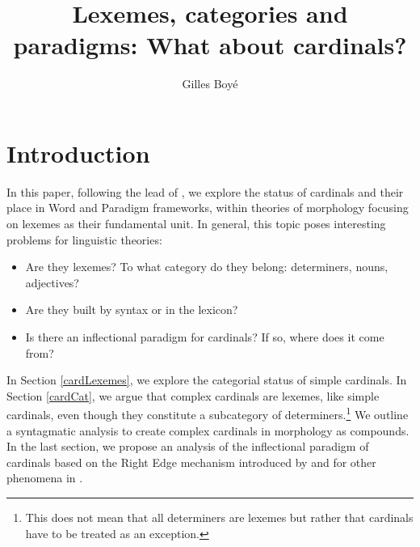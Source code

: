 \documentclass[output=paper]{langsci/langscibook}
\title{Lexemes, categories and paradigms: What about cardinals?}
\author{Gilles Boyé \affiliation{Université Bordeaux-Montaigne \& UMR5263 (CNRS)}}
\begin{document}

\section{Introduction}\label{Sec0}
In this paper, following the lead of \cite{Saulnier08,Saulnier10}, we explore the status of  cardinals  and their place in Word and Paradigm frameworks, within theories of morphology focusing on lexemes as their fundamental unit. In general, this topic poses interesting problems for linguistic theories:
\begin{itemize}
\item Are they lexemes? To what category do they belong: determiners, nouns, adjectives?
\item Are they built by syntax or in the lexicon?
\item Is there an inflectional  paradigm  for cardinals? If so, where does it come from?
\end{itemize}


In Section \ref{cardLexemes}, we explore the categorial status of simple cardinals.
In Section \ref{cardCat}, we argue that complex cardinals  are lexemes, like simple cardinals, even though they constitute a subcategory of determiners.\footnote{This does not mean that all determiners are lexemes but rather that cardinals  have to be treated as an exception.} We outline a syntagmatic analysis  to create complex cardinals  in morphology as compounds. In the last section, we
propose an analysis of the inflectional  paradigm  of cardinals
based on the Right Edge mechanism introduced by \citet{Miller92} and \citet{Tseng03} for other phenomena in .

\end{document}
